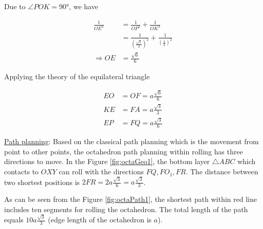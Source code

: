 \noindent Due to $\angle POK=\ang{90}$, we have

\begin{equation*} 
\label{octa:eq3}
\begin{split}
\frac{1}{OE^2} & = \frac{1}{OP^2}+\frac{1}{OK^2}\\
			   & = \frac{1}{(\frac{\sqrt{2}}{2})^2}+\frac{1}{(\frac{1}{2})^2}\\
\Rightarrow OE & = \frac{\sqrt{6}}{6}
\end{split}
\end{equation*}

\noindent Applying the theory of the equilateral triangle

\begin{equation*} 
\label{octa:eq4}
\begin{split}
EO & = OF = a\frac{\sqrt{6}}{6}\\
KE & = FA = a\frac{\sqrt{3}}{3}\\
EP & = FQ = a\frac{\sqrt{3}}{6}
\end{split}
\end{equation*}

\noindent\uline{Path planning}:
Based on the classical path planning which is the movement from point to other points, the octahedron path planning within rolling has three directions to move. In the Figure \ref{fig:octaGeo1}, the bottom layer $\triangle ABC$ which contacts to $OXY$ can roll with the directions $FQ, FO_1, FR$. The distance between two shortest positions is $2FR= 2a\frac{\sqrt{3}}{6}=a\frac{\sqrt{3}}{3}$. 

\noindent As can be seen from the Figure \ref{fig:octaPath1}, the shortest path within red line includes ten segments for rolling the octahedron. The total length of the path equals $10a\frac{\sqrt{3}}{3}$ (edge length of the octahedron is $a$).

